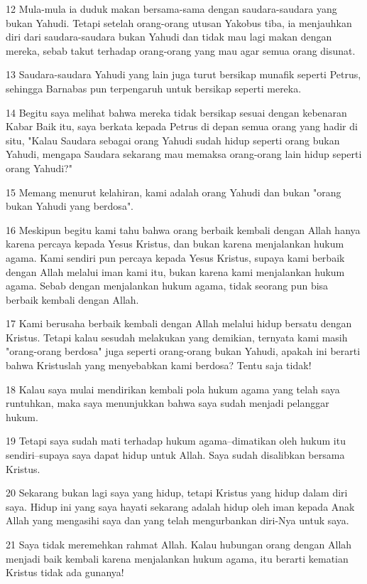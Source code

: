 \par 12 Mula-mula ia duduk makan bersama-sama dengan saudara-saudara yang bukan Yahudi. Tetapi setelah orang-orang utusan Yakobus tiba, ia menjauhkan diri dari saudara-saudara bukan Yahudi dan tidak mau lagi makan dengan mereka, sebab takut terhadap orang-orang yang mau agar semua orang disunat.
\par 13 Saudara-saudara Yahudi yang lain juga turut bersikap munafik seperti Petrus, sehingga Barnabas pun terpengaruh untuk bersikap seperti mereka.
\par 14 Begitu saya melihat bahwa mereka tidak bersikap sesuai dengan kebenaran Kabar Baik itu, saya berkata kepada Petrus di depan semua orang yang hadir di situ, "Kalau Saudara sebagai orang Yahudi sudah hidup seperti orang bukan Yahudi, mengapa Saudara sekarang mau memaksa orang-orang lain hidup seperti orang Yahudi?"
\par 15 Memang menurut kelahiran, kami adalah orang Yahudi dan bukan "orang bukan Yahudi yang berdosa".
\par 16 Meskipun begitu kami tahu bahwa orang berbaik kembali dengan Allah hanya karena percaya kepada Yesus Kristus, dan bukan karena menjalankan hukum agama. Kami sendiri pun percaya kepada Yesus Kristus, supaya kami berbaik dengan Allah melalui iman kami itu, bukan karena kami menjalankan hukum agama. Sebab dengan menjalankan hukum agama, tidak seorang pun bisa berbaik kembali dengan Allah.
\par 17 Kami berusaha berbaik kembali dengan Allah melalui hidup bersatu dengan Kristus. Tetapi kalau sesudah melakukan yang demikian, ternyata kami masih "orang-orang berdosa" juga seperti orang-orang bukan Yahudi, apakah ini berarti bahwa Kristuslah yang menyebabkan kami berdosa? Tentu saja tidak!
\par 18 Kalau saya mulai mendirikan kembali pola hukum agama yang telah saya runtuhkan, maka saya menunjukkan bahwa saya sudah menjadi pelanggar hukum.
\par 19 Tetapi saya sudah mati terhadap hukum agama--dimatikan oleh hukum itu sendiri--supaya saya dapat hidup untuk Allah. Saya sudah disalibkan bersama Kristus.
\par 20 Sekarang bukan lagi saya yang hidup, tetapi Kristus yang hidup dalam diri saya. Hidup ini yang saya hayati sekarang adalah hidup oleh iman kepada Anak Allah yang mengasihi saya dan yang telah mengurbankan diri-Nya untuk saya.
\par 21 Saya tidak meremehkan rahmat Allah. Kalau hubungan orang dengan Allah menjadi baik kembali karena menjalankan hukum agama, itu berarti kematian Kristus tidak ada gunanya!

